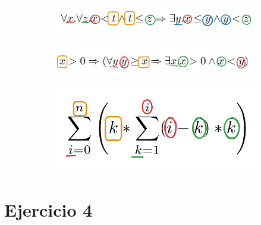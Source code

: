 \documentclass{article}
\begin{document}
\begin{figure}[!htb]
	\centering
	\begin{subfigure}[b]{0.4\textwidth}
		\centering
		\includegraphics[width=\textwidth]{02-03-a.png}
	\end{subfigure}
	\hfil
	\begin{subfigure}[b]{0.4\textwidth}
		\centering
		\includegraphics[width=\textwidth]{02-03-b.png}
	\end{subfigure}
	\hfil
	\begin{subfigure}[b]{0.25\textwidth}
		\centering
		\includegraphics[width=\textwidth]{02-03-c.png}
	\end{subfigure}
\end{figure}

\section*{Ejercicio 4}
\end{document}
